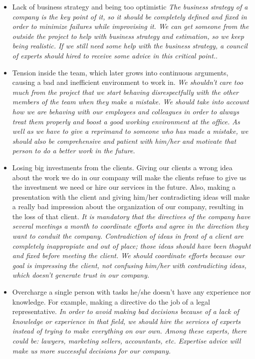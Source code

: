 \documentclass{article}
\begin{document}
\begin{itemize}
	\item Lack of business strategy and being too optimistic \textit{The business strategy of a company is the key point of it, so it should be completely defined and fixed in order to minimize failures while improvising it. We can get someone from the outside the project to help with business strategy and estimation, so we keep being realistic. If we still need some help with the business strategy, a council of experts should hired to receive some advice in this critical point.}.
	
	\item Tension inside the team, which later grows into continuous arguments, causing a bad and inefficient environment to work in. \textit{We shouldn't care too much from the project that we start behaving disrespectfully with the other members of the team when they make a mistake. We should take into account how we are behaving with our employees and colleagues in order to always treat them properly and boost a good working environment at the office. As well as we have to give a reprimand to someone who has made a mistake, we should also be comprehensive and patient with him/her and motivate that person to do a better work in the future.}

	\item Losing big investments from the clients. Giving our clients a wrong idea about the work we do in our company will make the clients refuse to give us the investment we need or hire our services in the future. Also, making a presentation with the client and giving him/her contradicting ideas will make a really bad impression about the organization of our company, resulting in the loss of that client. \textit{It is mandatory that the directives of the company have several meetings a month to coordinate efforts and agree in the direction they want to conduit the company. Contradiction of ideas in front of a client are completely inappropiate and out of place; those ideas should have been thoguht and fixed before meeting the client. We should coordinate efforts because our goal is impressing the client, not confusing him/her with contradicting ideas, which doesn't generate trust in our company.}
	
	\item Overcharge a single person with tasks he/she doesn't have any experience nor knowledge. For example, making a directive do the job of a legal representative. \textit{In order to avoid making bad decisions because of a lack of knowledge or experience in that field, we should hire the services of experts instead of trying to make everything on our own. Among these experts, there could be: lawyers, marketing sellers, accountants, etc. Expertise advice will make us more successful decisions for our company.}
	

\end{itemize}
\end{document}
